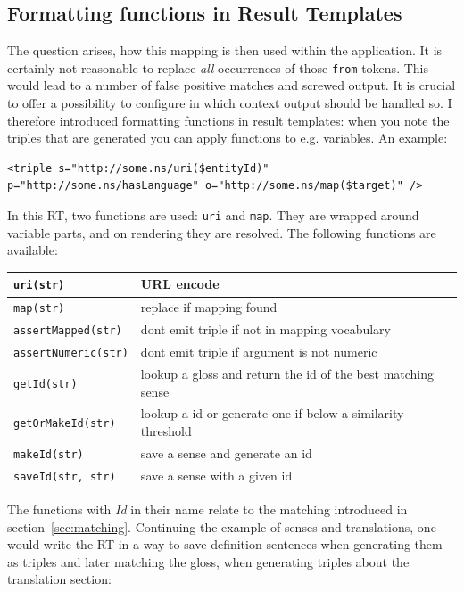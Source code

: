 \subsection{Formatting functions in Result Templates}\label{sec:functions}
The question arises, how this mapping is then used within the application. It is certainly not reasonable to replace \textit{all} occurrences of those \texttt{from} tokens. This would lead to a number of false positive matches and screwed output. It is crucial to offer a possibility to configure in which context output should be handled so.
I therefore introduced formatting functions in result templates: when you note the triples that are generated you can apply functions to e.g. variables. An example:
\begin{lstlisting}[style=XML]
<triple s="http://some.ns/uri($entityId)" p="http://some.ns/hasLanguage" o="http://some.ns/map($target)" />
\end{lstlisting}
In this RT, two functions are used: \texttt{uri} and \texttt{map}. They are wrapped around variable parts, and on rendering they are resolved. The following functions are available:\\
\begin{table}[h!] 
\centering 
\begin{tabular}{|l|l|}
\hline \texttt{uri(str)} & URL encode \\ 
\hline \texttt{map(str)} & replace if mapping found \\ 
\hline \texttt{assertMapped(str)} & dont emit triple if not in mapping vocabulary \\ 
\hline \texttt{assertNumeric(str)} & dont emit triple if argument is not numeric \\ 
\hline \texttt{getId(str)} & lookup a gloss and return the id of the best matching sense \\ 
\hline \texttt{getOrMakeId(str)} & lookup a id or generate one if below a similarity threshold \\ 
\hline \texttt{makeId(str)} & save a sense and generate an id \\ 
\hline \texttt{saveId(str, str)} & save a sense with a given id \\ 
\hline 
\end{tabular} 
\end{table}
The functions with \textit{Id} in their name relate to the matching introduced in section~\ref{sec:matching}. Continuing the example of senses and translations, one would write the RT in a way to save definition sentences when generating them as triples and later matching the gloss, when generating triples about the translation section:
